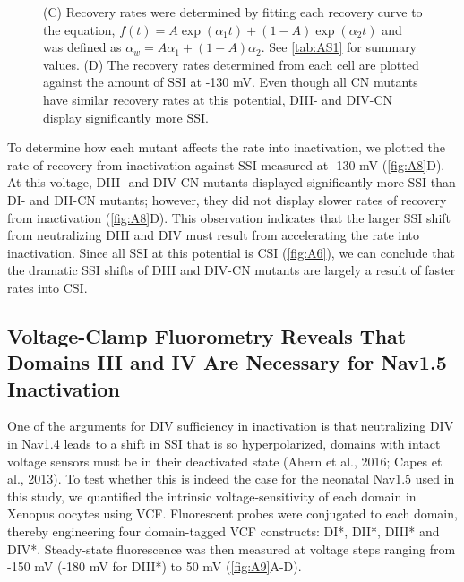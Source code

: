 \begin{figure}[t]
\begin{minipage}[c]{70mm}
{    (C) Recovery rates were determined by fitting each recovery curve to the equation, $f\left(t\right)=A\exp{(\alpha_1t)}+\left(1-A\right)\exp{\left(\alpha_2t\right)}$ and was defined as $\alpha_w=A\alpha_1+\left(1-A\right)\alpha_2$. See \autoref{tab:AS1} for summary values.
    (D) The recovery rates determined from each cell are plotted against the amount of SSI at -130 mV. Even though all CN mutants have similar recovery rates at this potential, DIII- and DIV-CN display significantly more SSI.}
    \label{fig:A8}
\end{minipage}
\end{figure}

To determine how each mutant affects the rate into inactivation, we plotted the rate of recovery from inactivation against SSI measured at -130 mV (\autoref{fig:A8}D). At this voltage, DIII- and DIV-CN mutants displayed significantly more SSI than DI- and DII-CN mutants; however, they did not display slower rates of recovery from inactivation (\autoref{fig:A8}D). This observation indicates that the larger SSI shift from neutralizing DIII and DIV must result from accelerating the rate into inactivation. Since all SSI at this potential is CSI (\autoref{fig:A6}), we can conclude that the dramatic SSI shifts of DIII and DIV-CN mutants are largely a result of faster rates into CSI.

\subsection{Voltage-Clamp Fluorometry Reveals That Domains III and IV Are Necessary for Nav1.5 Inactivation}
One of the arguments for DIV sufficiency in inactivation is that neutralizing DIV in Nav1.4 leads to a shift in SSI that is so hyperpolarized, domains with intact voltage sensors must be in their deactivated state (Ahern et al., 2016; Capes et al., 2013). To test whether this is indeed the case for the neonatal Nav1.5 used in this study, we quantified the intrinsic voltage-sensitivity of each domain in Xenopus oocytes using VCF. Fluorescent probes were conjugated to each domain, thereby engineering four domain-tagged VCF constructs: DI*, DII*, DIII* and DIV*. Steady-state fluorescence was then measured at voltage steps ranging from -150 mV (-180 mV for DIII*) to 50 mV (\autoref{fig:A9}A-D).

